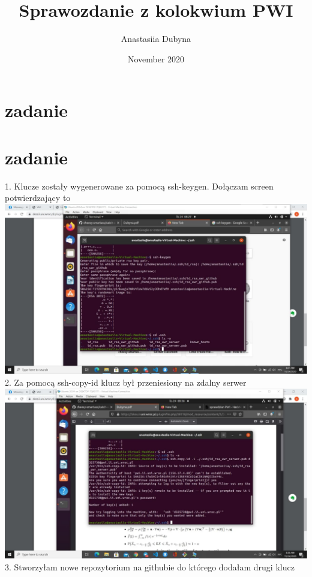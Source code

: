 \documentclass{article}
\title{Sprawozdanie z kolokwium PWI}
\author{Anastasiia Dubyna }
\date{November 2020}
\begin{document}
\maketitle

\section{zadanie}

\section{zadanie}
1. Klucze zostały wygenerowane za pomocą ssh-keygen. Dołączam screen potwierdzający to\\ 
\includegraphics[scale = 0.5]{photo_2020-11-24_08-28-03.jpg}\\
2. Za pomocą ssh-copy-id klucz był przeniesiony na zdalny serwer\\
\includegraphics[scale = 0.5]{photo_2020-11-24_09-24-22.jpg}\\
3. Stworzyłam nowe repozytorium na githubie do którego dodałam drugi klucz \\
\end{document}
